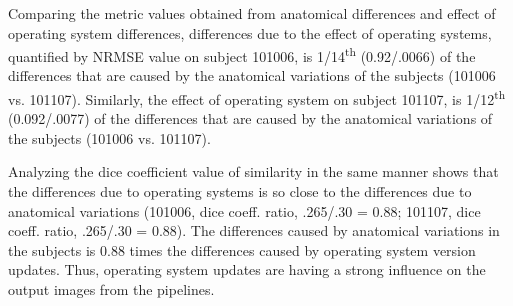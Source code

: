 Comparing the metric values obtained from anatomical differences and effect of operating system differences, differences due to the effect of operating systems, quantified by NRMSE value on subject 101006, is 1/14\textsuperscript{th} (0.92/.0066) of the differences that are caused by the anatomical variations of the subjects (101006 vs. 101107). Similarly, the effect of operating system on subject 101107, is 1/12\textsuperscript{th} (0.092/.0077) of the differences that are caused by the anatomical variations of the subjects (101006 vs. 101107).

Analyzing the dice coefficient value of similarity in the same manner shows that the differences due to operating systems is so close to the differences due to anatomical variations (101006, dice coeff. ratio, .265/.30 = 0.88; 101107, dice coeff. ratio, .265/.30 = 0.88). The differences caused by anatomical variations in the subjects is 0.88 times the differences caused by operating system version updates. Thus, operating system updates are having a strong influence on the output images from the pipelines.
